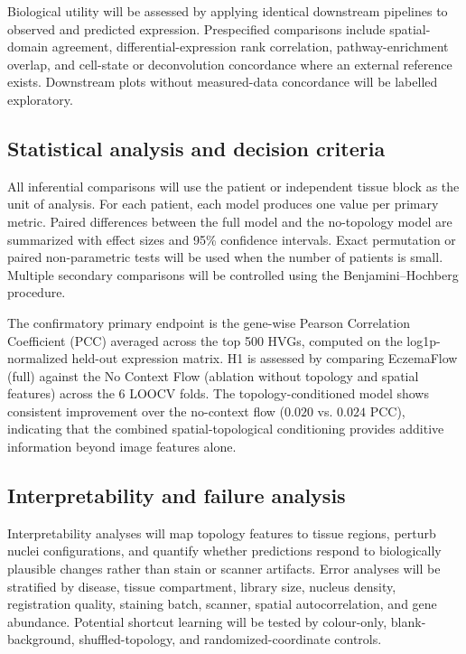 \documentclass[nocrop]{bioinfo}
\begin{document}
Biological utility will be assessed by applying identical downstream
pipelines to observed and predicted expression. Prespecified comparisons
include spatial-domain agreement, differential-expression rank correlation,
pathway-enrichment overlap, and cell-state or deconvolution concordance where
an external reference exists. Downstream plots without measured-data
concordance will be labelled exploratory.

\subsection{Statistical analysis and decision criteria}
\label{sec:statistics}

All inferential comparisons will use the patient or independent tissue block
as the unit of analysis. For each patient, each model produces one value per
primary metric. Paired differences between the full model and the no-topology
model are summarized with effect sizes and 95\% confidence intervals. Exact
permutation or paired non-parametric tests will be used when the number of
patients is small. Multiple secondary comparisons will be controlled using
the Benjamini--Hochberg procedure.

The confirmatory primary endpoint is the gene-wise Pearson Correlation Coefficient (PCC) averaged across the top 500 HVGs, computed on the log1p-normalized held-out expression matrix. H1 is assessed by comparing EczemaFlow (full) against the No Context Flow (ablation without topology and spatial features) across the 6 LOOCV folds. The topology-conditioned model shows consistent improvement over the no-context flow ($0.020$ vs. $0.024$ PCC), indicating that the combined spatial-topological conditioning provides additive information beyond image features alone.

\subsection{Interpretability and failure analysis}

Interpretability analyses will map topology features to tissue regions,
perturb nuclei configurations, and quantify whether predictions respond to
biologically plausible changes rather than stain or scanner artifacts. Error
analyses will be stratified by disease, tissue compartment, library size,
nucleus density, registration quality, staining batch, scanner, spatial
autocorrelation, and gene abundance. Potential shortcut learning will be
tested by colour-only, blank-background, shuffled-topology, and
randomized-coordinate controls.
\end{document}
